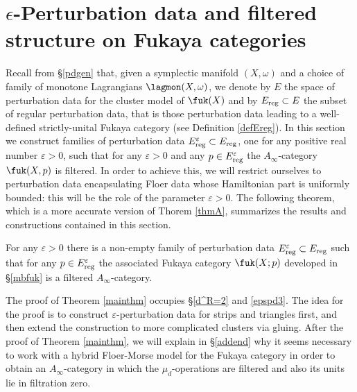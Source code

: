 	\newpage
	
	\section{$\epsilon$-Perturbation data and filtered structure on Fukaya categories}\label{actualconstruction}
	
	Recall from \S \ref{pdgen} that, given a symplectic manifold $(X,\omega)$ and a choice of family of monotone Lagrangians $\lagmon(X,\omega)$, we denote by $E$ the space of perturbation data for the cluster model of $\fuk(X)$ and by $E_\textnormal{reg}\subset E$ the subset of regular perturbation data, that is those perturbation data leading to a well-defined strictly-unital Fukaya category (see Definition \ref{defEreg}). In this section we construct families of perturbation data $E^\varepsilon_\textnormal{reg}\subset E_\textnormal{reg}$, one for any positive real number $\varepsilon>0$, such that for any $\varepsilon>0$ and any $p\in E^\varepsilon_\textnormal{reg}$ the $A_\infty$-category $\fuk(X,p)$ is filtered. In order to achieve this, we will restrict ourselves to perturbation data encapsulating Floer data whose Hamiltonian part is uniformly bounded: this will be the role of the parameter $\varepsilon>0$. The following theorem, which is a more accurate version of Thorem \ref{thmA}, summarizes the results and constructions contained in this section.
	\vspace{0.5mm}
	\begin{thm}\label{mainthm}
		For any $\varepsilon>0$ there is a non-empty family of perturbation data $E^\varepsilon_\textnormal{reg}\subset E_\textnormal{reg}$ such that for any $p\in E^\varepsilon_{\textnormal{reg}}$ the associated Fukaya category $\fuk(X;p)$ developed in \S \ref{mbfuk} is a filtered $A_\infty$-category.
	\end{thm}
	\noindent The proof of Theorem \ref{mainthm} occupies \S \ref{d^R=2} and \ref{epspd3}. The idea for the proof is to construct $\varepsilon$-perturbation data for strips and triangles first, and then extend the construction to more complicated clusters via gluing. After the proof of Theorem \ref{mainthm}, we will explain in \S \ref{addend} why it seems necessary to work with a hybrid Floer-Morse model for the Fukaya category in order to obtain an $A_\infty$-category in which the $\mu_d$-operations are filtered and also its units lie in filtration zero.
